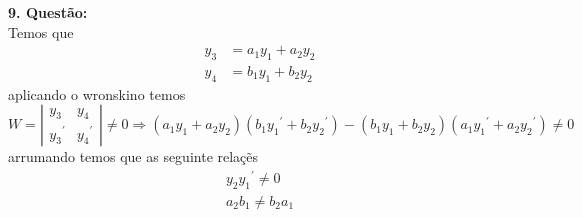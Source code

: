 \documentclass[a4paper,12pt]{article}
\begin{document}
\textbf{9. Quest\~ao:}\\
Temos que 
\begin{align*}
	y_3 &= a_1 y_1 + a_2 y_2 \\
	y_4 &= b_1 y_1 + b_2 y_2
\end{align*}
aplicando o wronskino temos 
\[W = \left | 
	\begin{array}{cc}
		y_3 & y_4 \\
		{y_3}^{'} & {y_4}^{'}
	\end{array}
	\right | \neq 0 \Rightarrow (a_1 y_1 + a_2 y_2)( b_1 {y_1}^{'} + b_2 {y_2}^{'}) - (b_1 y_1 + b_2 y_2)( a_1
	{y_1}^{'} + a_2 {y_2}^{'}) \neq 0
\]
arrumando temos que as seguinte rela\c c\~es 
\begin{align*}
	y_2 {y_1}^{'} \neq 0 \\
	a_2 b_1 \neq b_2 a_1
\end{align*}
\end{document}
